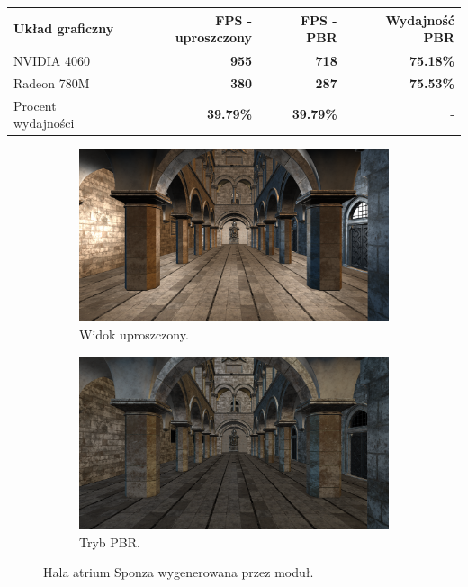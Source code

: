 \begin{center}
	\begin{tabular}{ |l r r r|}
		\hline
		\textbf{Układ graficzny} & \textbf{FPS - uproszczony} & \textbf{FPS - PBR} & \textbf{Wydajność PBR} \\
		\hline
		NVIDIA 4060 & \textbf{955} & \textbf{718} & \textbf{75.18\%} \\
		Radeon 780M & \textbf{380} & \textbf{287} & \textbf{75.53\%} \\
		Procent wydajności & \textbf{39.79\%} & \textbf{39.79\%} & - \\
		\hline
	\end{tabular}
\end{center}

	
\begin{figure}[h!]
	\centering
	\begin{subfigure}{.4\textwidth}
		\includegraphics[width=\textwidth]{images/demo_sponza_1.png}
		\caption{Widok uproszczony.}
	\end{subfigure}
	\begin{subfigure}{.4\textwidth}
		\includegraphics[width=\textwidth]{images/demo_sponza_1_pbr.png}
		\caption{Tryb PBR.}
	\end{subfigure}
	\caption{Hala atrium Sponza wygenerowana przez moduł.}
	\label{test_sponza_1}
\end{figure}

